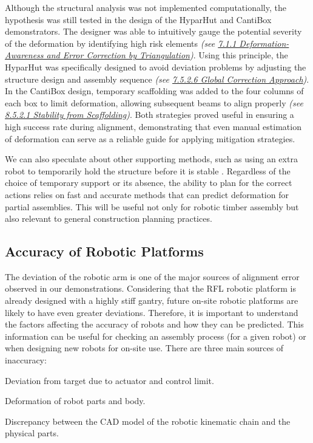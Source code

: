 Although the structural analysis was not implemented computationally, the hypothesis was still tested in the design of the HyparHut and CantiBox demonstrators. The designer was able to intuitively gauge the potential severity of the deformation by identifying high risk elements \textit{(see \ul{7.1.1 Deformation-Awareness and Error Correction by Triangulation})}. Using this principle, the HyparHut was specifically designed to avoid deviation problems by adjusting the structure design and assembly sequence \textit{(see \ul{7.5.2.6 Global Correction Approach})}. In the CantiBox design, temporary scaffolding was added to the four columns of each box to limit deformation, allowing subsequent beams to align properly\textit{ (see \ul{8.5.2.1 Stability from Scaffolding})}. Both strategies proved useful in ensuring a high success rate during alignment, demonstrating that even manual estimation of deformation can serve as a reliable guide for applying mitigation strategies. 

We can also speculate about other supporting methods, such as using an extra robot to temporarily hold the structure before it is stable \parencite{paraschoCooperativeRoboticAssembly2019, thomaRoboticFabricationBespoke2018}. Regardless of the choice of temporary support or its absence, the ability to plan for the correct actions relies on fast and accurate methods that can predict deformation for partial assemblies. This will be useful not only for robotic timber assembly but also relevant to general construction planning practices.

\subsection{Accuracy of Robotic Platforms}

The deviation of the robotic arm is one of the major sources of alignment error observed in our demonstrations. Considering that the RFL robotic platform is already designed with a highly stiff gantry, future on-site robotic platforms are likely to have even greater deviations. Therefore, it is important to understand the factors affecting the accuracy of robots and how they can be predicted. This information can be useful for checking an assembly process (for a given robot) or when designing new robots for on-site use. There are three main sources of inaccuracy:

\begin{description}[style=unboxed] %

	\item [Control Inaccuracy] Deviation from target due to actuator and control limit.

	\item [Mechanical Inaccuracy] Deformation of robot parts and body.

	\item [Forward Kinematics Inaccuracy] Discrepancy between the CAD model of the robotic kinematic chain and the physical parts. 

\end{description}

